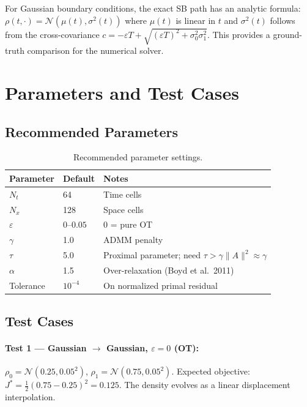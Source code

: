 \documentclass[11pt]{article}
\begin{document}
For Gaussian boundary conditions, the exact SB path has an analytic formula:
$\rho(t,\cdot) = \mathcal{N}(\mu(t), \sigma^2(t))$ where $\mu(t)$ is linear
in $t$ and $\sigma^2(t)$ follows from the cross-covariance
$c = -\varepsilon T + \sqrt{(\varepsilon T)^2 + \sigma_0^2\sigma_1^2}$.
This provides a ground-truth comparison for the numerical solver.

\section{Parameters and Test Cases}

\subsection{Recommended Parameters}

\begin{table}[h]
\centering
\caption{Recommended parameter settings.}
\begin{tabular}{lll}
\toprule
Parameter & Default & Notes \\
\midrule
$N_t$ & 64 & Time cells \\
$N_x$ & 128 & Space cells \\
$\varepsilon$ & $0$--$0.05$ & $0$ = pure OT \\
$\gamma$ & 1.0 & ADMM penalty \\
$\tau$   & 5.0 & Proximal parameter; need $\tau > \gamma\|A\|^2 \approx \gamma$ \\
$\alpha$ & 1.5 & Over-relaxation (Boyd et al.\ 2011) \\
Tolerance & $10^{-4}$ & On normalized primal residual \\
\bottomrule
\end{tabular}
\end{table}

\subsection{Test Cases}

\paragraph{Test 1 --- Gaussian $\to$ Gaussian, $\varepsilon = 0$ (OT):}
$\rho_0 = \mathcal{N}(0.25, 0.05^2)$, $\rho_1 = \mathcal{N}(0.75, 0.05^2)$.
Expected objective: $J^* = \frac{1}{2}(0.75 - 0.25)^2 = 0.125$.
The density evolves as a linear displacement interpolation.
\end{document}

